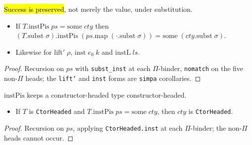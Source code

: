 \begin{lemma}
  \label{fam:proj-instpis-subst}
  \leanok

   \hl{Success is preserved}, not merely the value, under substitution.
  \begin{itemize}
  \item If $T.\mathrm{instPis}\;ps=\mathrm{some}\;cty$ then $(T.\mathrm{subst}\;\sigma).
        \mathrm{instPis}\;(ps.\mathrm{map}\;(\cdot.\mathrm{subst}\;\sigma)) =
        \mathrm{some}\;(cty.\mathrm{subst}\;\sigma)$.
  \item Likewise for $\mathrm{lift'}\;\rho$, $\mathrm{inst}\;e_0\;k$ and $\mathrm{instL}\;ls$.
  \end{itemize}
\end{lemma}
\begin{proof}
  \leanok
   Recursion on $ps$ with \texttt{subst\_inst} at each $\Pi$-binder, \texttt{nomatch} on
  the five non-$\Pi$ heads; the \texttt{lift'} and \texttt{inst} forms are \texttt{simpa}
  corollaries.
\end{proof}

\begin{lemma}
  \label{thm:proj-instpis-ctorheaded}
  \leanok

   $\mathrm{instPis}$ keeps a constructor-headed type constructor-headed.
  \begin{itemize}
  \item If $T$ is \texttt{CtorHeaded} and $T.\mathrm{instPis}\;ps=\mathrm{some}\;cty$, then $cty$
        is \texttt{CtorHeaded}.
  \end{itemize}
\end{lemma}
\begin{proof}
  \leanok
   Recursion on $ps$, applying \texttt{CtorHeaded.inst} at each $\Pi$-binder; the
  non-$\Pi$ heads cannot occur.
\end{proof}

